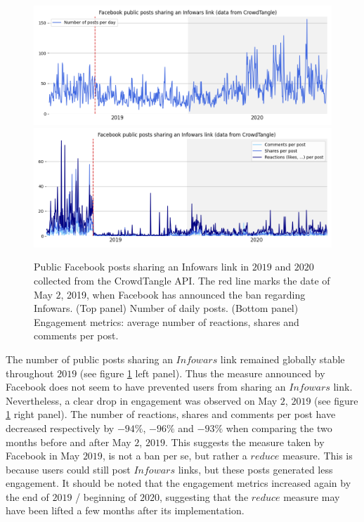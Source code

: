 \documentclass{article}
\begin{document}
\begin{figure}[h]
\hspace{-2em}
		\includegraphics[scale=0.32]{../figure/facebook_crowdtangle_infowars_1.png}
		\includegraphics[scale=0.32]{../figure/facebook_crowdtangle_infowars_2.png} 
	\caption{Public Facebook posts sharing an Infowars link in $2019$ and $2020$ collected from the CrowdTangle API. The red line marks the date of May $2$, 2019, when Facebook has announced the ban regarding Infowars. (Top panel) Number of daily posts. (Bottom panel) Engagement metrics: average number of reactions, shares and comments per post. }
	\label{infowars1}
\end{figure}

The number of public posts sharing an $Infowars$ link remained globally stable throughout $2019$ (see figure \ref{infowars1} left panel). 
Thus the measure announced by Facebook does not seem to have prevented users from sharing an $Infowars$ link. Nevertheless, a clear drop in engagement was observed on May $2$, $2019$ (see figure \ref{infowars1} right panel). 
The number of reactions, shares and comments per post have decreased respectively  by $-94\%$,  $-96\%$ and $-93\%$  when comparing the two months before and after May $2$, $2019$. This suggests the measure taken by Facebook in May $2019$, is not a ban per se, but rather a $reduce$ measure. This is because users could still post $Infowars$ links, but these posts generated less engagement. It should be noted that the engagement metrics increased again by the end of $2019$ / beginning of $2020$, suggesting that the $reduce$ measure may have been lifted a few months after its implementation.
\end{document}
